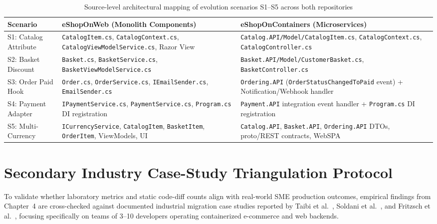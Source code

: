 \begin{table}[h]
  \caption{Source-level architectural mapping of evolution scenarios S1--S5 across both repositories}
  \label{tab:code-mapping}
  \centering
  \begin{tabular}{p{2.3cm}p{5.6cm}p{5.8cm}}
    \toprule
    \textbf{Scenario} & \textbf{eShopOnWeb (Monolith Components)} & \textbf{eShopOnContainers (Microservices)} \\
    \midrule
    S1: Catalog Attribute & \texttt{CatalogItem.cs}, \texttt{CatalogContext.cs}, \texttt{CatalogViewModelService.cs}, Razor View & \texttt{Catalog.API/Model/CatalogItem.cs}, \texttt{CatalogContext.cs}, \texttt{CatalogController.cs} \\
    S2: Basket Discount & \texttt{Basket.cs}, \texttt{BasketService.cs}, \texttt{BasketViewModelService.cs} & \texttt{Basket.API/Model/CustomerBasket.cs}, \texttt{BasketController.cs} \\
    S3: Order Paid Hook & \texttt{Order.cs}, \texttt{OrderService.cs}, \texttt{IEmailSender.cs}, \texttt{EmailSender.cs} & \texttt{Ordering.API} (\texttt{OrderStatusChangedToPaid} event) + Notification/Webhook handler \\
    S4: Payment Adapter & \texttt{IPaymentService.cs}, \texttt{PaymentService.cs}, \texttt{Program.cs} DI registration & \texttt{Payment.API} integration event handler + \texttt{Program.cs} DI registration \\
    S5: Multi-Currency & \texttt{ICurrencyService}, \texttt{CatalogItem}, \texttt{BasketItem}, \texttt{OrderItem}, ViewModels, UI & \texttt{Catalog.API}, \texttt{Basket.API}, \texttt{Ordering.API} DTOs, proto/REST contracts, WebSPA \\
    \bottomrule
  \end{tabular}
\end{table}

\section{Secondary Industry Case-Study Triangulation Protocol}
\label{sec:triangulation-protocol}
To validate whether laboratory metrics and static code-diff counts align with real-world SME production outcomes, empirical findings from Chapter~4 are cross-checked against documented industrial migration case studies reported by Taibi et al.\ \cite{taibi2017}, Soldani et al.\ \cite{soldani2018}, and Fritzsch et al.\ \cite{fritzsch2019}, focusing specifically on teams of 3--10 developers operating containerized e-commerce and web backends.

